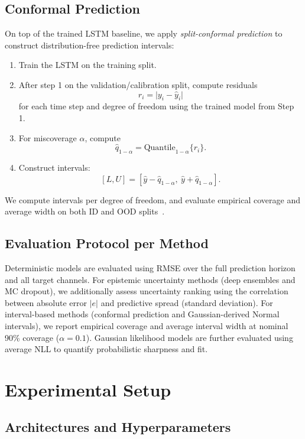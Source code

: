 \documentclass[a4paper,fleqn]{cas-sc}
\begin{document}
\subsection{Conformal Prediction}

On top of the trained LSTM baseline, we apply \emph{split-conformal prediction} to construct distribution-free prediction intervals:
\begin{enumerate}
    \item Train the LSTM on the training split.
    \item After step 1 on the validation/calibration split, compute residuals
    \[
    r_i = \bigl|y_i - \hat{y}_i\bigr|
    \]
    for each time step and degree of freedom using the trained model from Step 1.
    \item For miscoverage \(\alpha\), compute
    \[
    \hat{q}_{1-\alpha} = \mathrm{Quantile}_{1-\alpha}\{r_i\}.
    \]
    \item Construct intervals:
    \[
    [L, U] = [\hat{y} - \hat{q}_{1-\alpha},\ \hat{y} + \hat{q}_{1-\alpha}].
    \]
\end{enumerate}

We compute intervals per degree of freedom, and evaluate empirical coverage and average width on both ID and OOD splits~\cite{stankeviciute2021conformal}.


\subsection{Evaluation Protocol per Method}
Deterministic models are evaluated using RMSE over the full prediction horizon and all target channels. For epistemic uncertainty methods (deep ensembles and MC dropout), we additionally assess uncertainty ranking using the correlation between absolute error \(|e|\) and predictive spread (standard deviation). For interval-based methods (conformal prediction and Gaussian-derived Normal intervals), we report empirical coverage and average interval width at nominal 90\% coverage (\(\alpha=0.1\)). Gaussian likelihood models are further evaluated using average NLL to quantify probabilistic sharpness and fit.


\section{Experimental Setup}

\subsection{Architectures and Hyperparameters}
\end{document}

